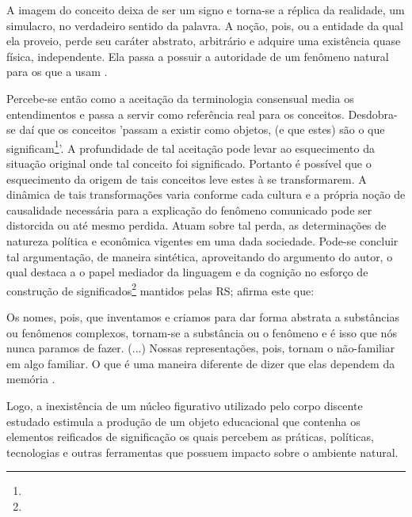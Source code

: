 \documentclass[
  12pt,       %
  openright,      %
  twoside,      %
  a4paper,      %
  english,      %
  french,       %
  spanish,      %
  brazil        %
  ]{abntex2}
\begin{document}
\begin{citacao}
A imagem do
conceito deixa de ser um signo e torna-se a réplica da realidade,
um simulacro, no verdadeiro sentido da palavra. A noção, pois, ou a
entidade da qual ela proveio, perde seu caráter abstrato, 
arbitrário e adquire uma existência quase física, independente. 
Ela passa a possuir a autoridade de um fenômeno natural para os que a
usam \cite[p.74]{Representacees_sociais_moscovici}. 
\end{citacao}


Percebe-se então como a aceitação da terminologia consensual media os entendimentos e passa a servir como referência real para os conceitos. Desdobra-se daí que os conceitos 'passam a existir como objetos, (e que estes) são o que significam\footnote{}'. A profundidade de tal aceitação pode levar ao esquecimento da situação original onde tal conceito foi significado. Portanto é possível que o esquecimento da origem de tais conceitos leve estes à se transformarem. A dinâmica de tais transformações varia conforme cada cultura e a própria noção de causalidade necessária para a explicação do fenômeno comunicado pode ser distorcida ou até mesmo perdida. Atuam sobre tal perda, as determinações de natureza política e econômica vigentes em uma dada sociedade. Pode-se concluir tal argumentação, de maneira sintética, aproveitando do argumento do autor, o qual destaca a o papel mediador da linguagem e da cognição no esforço de construção de significados\footnote{} mantidos pelas RS; afirma este que:

\begin{citacao}
Os nomes, pois,
que inventamos e criamos para dar forma abstrata a substâncias
ou fenômenos complexos, tornam-se a substância ou o fenômeno e
é isso que nós nunca paramos de fazer. (...) Nossas representações,
pois, tornam o não-familiar em algo familiar. O que é uma maneira
diferente de dizer que elas dependem da memória \cite[p.77-78]{Representacees_sociais_moscovici}.
\end{citacao}

Logo, a inexistência de um núcleo figurativo utilizado pelo corpo discente estudado estimula a produção de um objeto educacional que contenha os elementos reificados de significação os quais percebem as práticas, políticas, tecnologias e outras ferramentas que possuem impacto sobre o ambiente natural.
\end{document}
